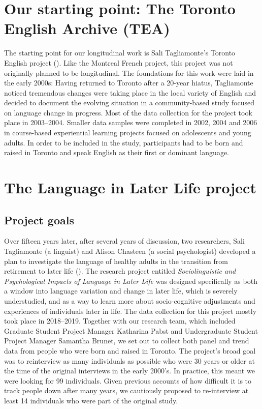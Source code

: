 \documentclass[output=paper]{langscibook}
\begin{document}
\section{Our starting point: The Toronto English Archive (TEA)}
\label{sec:pabst:2}
The starting point for our longitudinal work is Sali Tagliamonte’s Toronto English project (\citealt{Tagliamonte2003b}). Like the Montreal French project, this project was not originally planned to be longitudinal. The foundations for this work were laid in the early 2000s: Having returned to Toronto after a 20-year hiatus, Tagliamonte noticed tremendous changes were taking place in the local variety of English and decided to document the evolving situation in a community-based study focused on language change in progress. Most of the data collection for the project took place in 2003--2004. Smaller data samples were completed in 2002, 2004 and 2006 in course-based experiential learning projects focused on adolescents and young adults. In order to be included in the study, participants had to be born and raised in Toronto and speak English as their first or dominant language.\\

\section{The Language in Later Life project}
\label{sec:pabst:3}
\subsection{Project goals}
\label{sec:pabst:3.1}
Over fifteen years later, after several years of discussion, two researchers, Sali Tagliamonte (a linguist) and Alison Chasteen (a social psychologist) developed a plan to investigate the language of healthy adults in the transition from retirement to later life (\citealt{ChasteenTagliamonte2018}). The research project entitled \textit{Sociolinguistic and Psychological Impacts of Language in Later Life} was designed specifically as both a window into language variation and change in later life, which is severely understudied, and as a way to learn more about socio-cognitive adjustments and experiences of individuals later in life. The data collection for this project mostly took place in 2018--2019. Together with our research team, which included Graduate Student Project Manager Katharina Pabst and Undergraduate Student Project Manager Samantha Brunet, we set out to collect both panel and trend data from people who were born and raised in Toronto. The project’s broad goal was to reinterview as many individuals as possible who were 30 years or older at the time of the original interviews in the early 2000’s. In practice, this meant we were looking for 99 individuals. Given previous accounts of how difficult it is to track people down after many years, we cautiously proposed to re-interview at least 14 individuals who were part of the original study.
\end{document}
